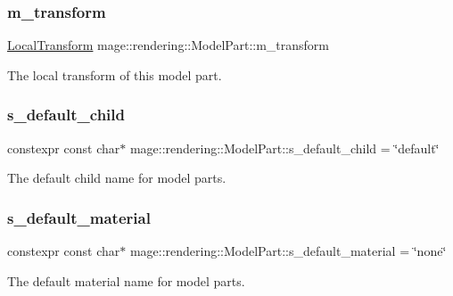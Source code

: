 \subsubsection{\texorpdfstring{m\+\_\+transform}{m\_transform}}
{\footnotesize\ttfamily \hyperlink{classmage_1_1_local_transform}{Local\+Transform} mage\+::rendering\+::\+Model\+Part\+::m\+\_\+transform}

The local transform of this model part. \hypertarget{structmage_1_1rendering_1_1_model_part_ac3e89be808deeddd01e1c7445e23044d}{}\label{structmage_1_1rendering_1_1_model_part_ac3e89be808deeddd01e1c7445e23044d} 
\subsubsection{\texorpdfstring{s\+\_\+default\+\_\+child}{s\_default\_child}}
{\footnotesize\ttfamily constexpr const char$\ast$ mage\+::rendering\+::\+Model\+Part\+::s\+\_\+default\+\_\+child = \char`\"{}default\char`\"{}\hspace{0.3cm}{\ttfamily [static]}}

The default child name for model parts. \hypertarget{structmage_1_1rendering_1_1_model_part_a4fd4471a31cdf49d5f07448207916d6c}{}\label{structmage_1_1rendering_1_1_model_part_a4fd4471a31cdf49d5f07448207916d6c} 
\subsubsection{\texorpdfstring{s\+\_\+default\+\_\+material}{s\_default\_material}}
{\footnotesize\ttfamily constexpr const char$\ast$ mage\+::rendering\+::\+Model\+Part\+::s\+\_\+default\+\_\+material = \char`\"{}none\char`\"{}\hspace{0.3cm}{\ttfamily [static]}}

The default material name for model parts. \hypertarget{structmage_1_1rendering_1_1_model_part_a030fd86febd5de7d3433a4f54e06c6a8}{}\label{structmage_1_1rendering_1_1_model_part_a030fd86febd5de7d3433a4f54e06c6a8} 
